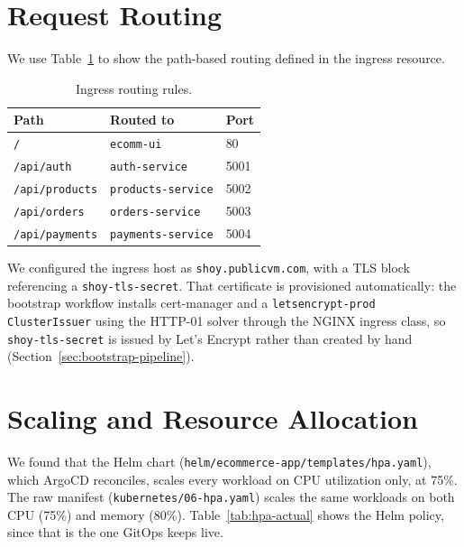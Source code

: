 \section{Request Routing}\label{sec:primary-finding-two}
We use Table~\ref{tab:ingress-routing} to show the path-based routing defined in the ingress
resource.

\begin{table}[H]
\centering
\caption{Ingress routing rules.}
\label{tab:ingress-routing}
\small
\begin{tabular}{lll}
\toprule
\textbf{Path} & \textbf{Routed to} & \textbf{Port} \\
\midrule
\texttt{/} & \texttt{ecomm-ui} & 80 \\
\texttt{/api/auth} & \texttt{auth-service} & 5001 \\
\texttt{/api/products} & \texttt{products-service} & 5002 \\
\texttt{/api/orders} & \texttt{orders-service} & 5003 \\
\texttt{/api/payments} & \texttt{payments-service} & 5004 \\
\bottomrule
\end{tabular}
\end{table}

We configured the ingress host as \texttt{shoy.publicvm.com}, with a TLS block referencing a
\texttt{shoy-tls-secret}. That certificate is provisioned automatically: the
bootstrap workflow installs cert-manager and a \texttt{letsencrypt-prod}
\texttt{ClusterIssuer} using the HTTP-01 solver through the NGINX ingress class,
so \texttt{shoy-tls-secret} is issued by Let's Encrypt rather than created by hand
(Section~\ref{sec:bootstrap-pipeline}).

\section{Scaling and Resource Allocation}\label{sec:scaling-resource-allocation}
\begin{warningbox}
We found that the Helm chart (\texttt{helm/\allowbreak ecommerce-app/\allowbreak templates/\allowbreak hpa.yaml}), which ArgoCD
reconciles, scales every workload on CPU utilization only, at 75\%. The raw manifest
(\texttt{kubernetes/06-hpa.yaml}) scales the same workloads on both CPU (75\%) and
memory (80\%). Table~\ref{tab:hpa-actual} shows the Helm policy, since that is the
one GitOps keeps live.
\end{warningbox}

